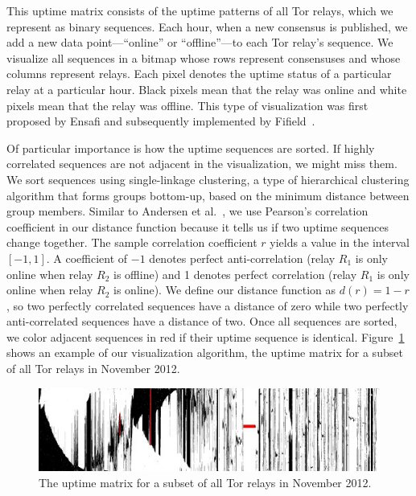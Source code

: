 This uptime matrix consists of the uptime patterns of all Tor relays, which we
represent as binary sequences.  Each hour, when a new consensus is published, we
add a new data point---``online'' or ``offline''---to each Tor relay's sequence.
We visualize all sequences in a bitmap whose rows represent consensuses and
whose columns represent relays.  Each pixel denotes the uptime status of a
particular relay at a particular hour.  Black pixels mean that the relay was
online and white pixels mean that the relay was offline.  This type of
visualization was first proposed by Ensafi and subsequently implemented by
Fifield~\cite{Fifield2014a}.

Of particular importance is how the uptime sequences are sorted.  If highly
correlated sequences are not adjacent in the visualization, we might miss them.
We sort sequences using single-linkage clustering, a type of hierarchical
clustering algorithm that forms groups bottom-up, based on the minimum distance
between group members.  Similar to Andersen et al.~\cite{Andersen2002a}, we use
Pearson's correlation coefficient in our distance function because it tells us
if two uptime sequences change together.  The sample correlation coefficient $r$
% 
% 
yields a value in the interval $[-1, 1]$.
A coefficient of $-1$ denotes perfect anti-correlation
(relay $R_1$ is only online when relay $R_2$ is offline) and 1 denotes perfect
correlation (relay $R_1$ is only online when relay $R_2$ is online).  We define
our distance function as $d(r) = 1 - r$, so two perfectly correlated sequences
have a distance of zero while two perfectly anti-correlated sequences have a
distance of two.  Once all sequences are sorted, we color adjacent sequences in
red if their uptime sequence is identical.  Figure~\ref{fig:uptime-matrix} shows
an example of our visualization algorithm, the uptime matrix for a subset of all
Tor relays in November 2012.

\begin{figure}[t]
	\centering
	\includegraphics[width=\linewidth]{diagrams/2012-11.jpg}
	\caption{The uptime matrix for a subset of all Tor relays in November 2012.}
	\label{fig:uptime-matrix}
\end{figure}

